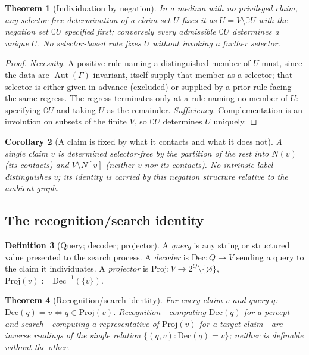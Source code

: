 \documentclass[11pt,twocolumn,a4paper]{article}
\theoremstyle{frathm}
\newtheorem{theorem}{Theorem}[section]
\newtheorem{corollary}[theorem]{Corollary}
\theoremstyle{definition}
\newtheorem{definition}[theorem]{Definition}
\theoremstyle{remark}
\newcommand{\Gph}{\Gamma}
\newcommand{\V}{V}
\newcommand{\co}{\complement}
\DeclareMathOperator{\Aut}{Aut}
\begin{document}
\begin{theorem}[Individuation by negation]
\label{thm:negation}
In a medium with no privileged claim, any selector-free determination of
a claim set $U$ fixes it as $U=\V\setminus\co U$ with the negation set
$\co U$ specified first; conversely every admissible $\co U$ determines a
unique $U$. No selector-based rule fixes $U$ without invoking a further
selector.
\end{theorem}

\begin{proof}
\emph{Necessity.} A positive rule naming a distinguished member of $U$
must, since the data are $\Aut(\Gph)$-invariant, itself supply that
member as a selector; that selector is either given in advance (excluded)
or supplied by a prior rule facing the same regress. The regress
terminates only at a rule naming no member of $U$: specifying $\co U$ and
taking $U$ as the remainder. \emph{Sufficiency.} Complementation is an
involution on subsets of the finite $\V$, so $\co U$ determines $U$
uniquely.
\end{proof}

\begin{corollary}[A claim is fixed by what it contacts and what it does
not]
\label{cor:nonneighbours}
A single claim $v$ is determined selector-free by the partition of the
rest into $N(v)$ (its contacts) and $\V\setminus N[v]$ (neither $v$ nor
its contacts). No intrinsic label distinguishes $v$; its identity is
carried by this negation structure relative to the ambient graph.
\end{corollary}

\subsection{The recognition/search identity}

\begin{definition}[Query; decoder; projector]
\label{def:decoder}
A \emph{query} is any string or structured value presented to the search
process. A \emph{decoder} is $\mathrm{Dec}:Q\to\V$ sending a query to the
claim it individuates. A \emph{projector} is $\mathrm{Proj}:\V\to
2^{Q}\setminus\{\varnothing\}$, $\mathrm{Proj}(v):=\mathrm{Dec}^{-1}(\{v\})$.
\end{definition}

\begin{theorem}[Recognition/search identity]
\label{thm:recognition-search}
For every claim $v$ and query $q$: $\mathrm{Dec}(q)=v \iff
q\in\mathrm{Proj}(v)$. \emph{Recognition}---computing $\mathrm{Dec}(q)$ for
a percept---and \emph{search}---computing a representative of
$\mathrm{Proj}(v)$ for a target claim---are inverse readings of the single
relation $\{(q,v):\mathrm{Dec}(q)=v\}$; neither is definable without the
other.
\end{theorem}
\end{document}
